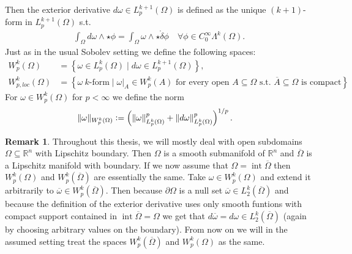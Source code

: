 \documentclass[12pt,a4paper]{article}
\numberwithin{equation}{subsection}
\numberwithin{lemma}{subsection}
\theoremstyle{definition}
\newtheorem{remark}[lemma]{Remark}
\DeclareMathOperator{\interior}{int}
\newcommand{\norm}[2]{\lVert #1 \rVert_{#2}}
\newcommand{\omegabar}{\overline{\Omega}}
\newcommand{\real}{\mathbb{R}}
\begin{document}
Then the exterior derivative $ d\omega \in L^{k+1}_p(\Omega)$ is defined as
the unique $(k+1)$-form in $L^{k+1}_p(\Omega)$ s.t. 
\begin{align*}
\int_\Omega d\omega \wedge \star\phi = \int_\Omega \omega \wedge 
\star\mathring{\delta}\phi
\quad \forall \phi \in C_0^\infty \Lambda^{k}(\Omega).
\end{align*}
Just as in the usual Sobolev setting we define the following spaces:
\begin{align*}
W^k_p(\Omega) &= \left\{ \omega \in L^k_p(\Omega) \mid 
     d\omega \in L_p^{k+1}(\Omega) \right\}, \\ 
W^k_{p,loc}(\Omega) &= \left\{ \omega \ k \text{-form} \mid 
\omega|_A \in W^k_p(A) \text{ for every open } A \subseteq \Omega 
\text{ s.t. } \overline{A} \subseteq \Omega \text{ is compact} %
\right\}.
\end{align*}
For $\omega \in W^k_p(\Omega)$ for $p<\infty$ we define the norm 
\begin{align*}
\lVert \omega \rVert _{W^k_p(\Omega)} &\vcentcolon= 
\left( \norm{\omega}{L^k_p(\Omega)}^p 
    + \norm{d\omega}{L^k_p(\Omega)}^p \right)^{1/p}.
\end{align*}

\begin{remark} \label{rem:identification_sobolev_spaces}
    Throughout this thesis, we will mostly deal with open subdomains $\Omega 
    \subseteq \real^n$ with Lipschitz boundary. Then $\Omega$
    is a smooth submanifold of $\real^n$ and $\omegabar$ is a 
    Lipschitz manifold with boundary. If we now assume that
    $\Omega = \interior \omegabar$ then $W^k_p(\Omega)$ and $W^k_p(\omegabar)$
    are essentially the same. Take $\omega \in W^k_p(\Omega)$ and extend 
    it arbitrarily to $\overline{\omega} \in W^k_p(\omegabar)$. Then because 
    $\partial \Omega$ is a null set $\overline{\omega} \in L_2^k(\omegabar)$ and 
    because the definition of the exterior derivative uses only smooth 
    funtions with compact support contained in $\interior \omegabar = \Omega$ 
    we get that $d\overline{\omega} = d\omega \in L^k_2(\omegabar)$ (again 
    by choosing arbitrary values on the boundary). From now on we will in the
    assumed setting treat the spaces $W^k_p(\omegabar)$ and $W^k_p(\Omega)$ 
    as the same.
\end{remark}
    
\end{document}

